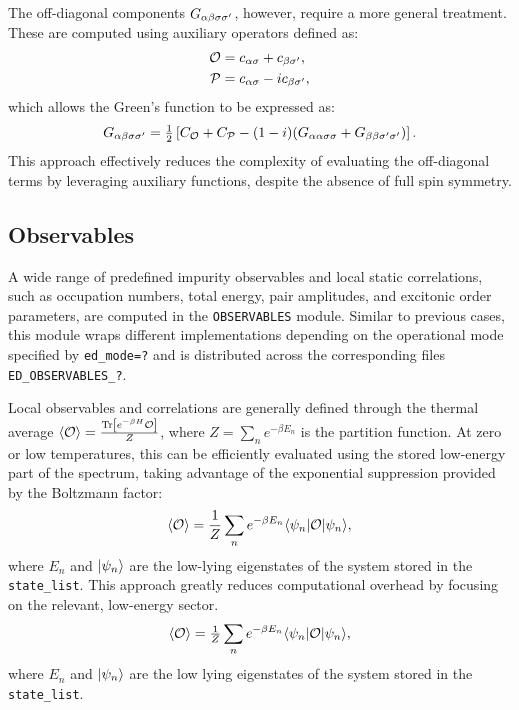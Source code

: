 \documentclass[edipack2.tex]{subfiles}
\begin{document}
The off-diagonal components $G_{\alpha\beta\sigma\sigma'}$, however, 
require a more general treatment. These are computed using 
auxiliary operators defined as:
\begin{align*}
{\cal O} &= c_{\alpha\sigma} + c_{\beta\sigma'}, \\
{\cal P} &= c_{\alpha\sigma} - i c_{\beta\sigma'},
\end{align*}
which allows the Green's function to be expressed as:
\begin{equation}
G_{\alpha\beta\sigma\sigma'} = \tfrac{1}{2} \left[ C_{\cal O} + C_{\cal P} - 
(1-i)(G_{\alpha\alpha\sigma\sigma} + G_{\beta\beta\sigma'\sigma'}) \right].
\end{equation}
This approach effectively reduces the complexity of 
evaluating the off-diagonal terms by leveraging auxiliary 
functions, despite the absence of full spin symmetry.





\subsection{Observables}\label{sSecObc}
A wide range of predefined impurity observables and local 
static correlations, such as occupation numbers, total 
energy, pair amplitudes, and excitonic order parameters, 
are computed in the \texttt{OBSERVABLES} module. Similar to 
previous cases, this module wraps different implementations 
depending on the operational mode specified by 
{\tt ed\_mode=?} and is distributed across the corresponding 
files {\tt ED\_OBSERVABLES\_?}. 



Local observables and correlations are generally defined 
through the thermal average 
$\langle {\cal O}\rangle = \frac{{\rm Tr}\left[e^{-\beta H}{\cal O}\right]}{Z}$, 
where $Z = \sum_n e^{-\beta E_n}$ is the partition function. 
At zero or low temperatures, this can be efficiently 
evaluated using the stored low-energy part of the spectrum, 
taking advantage of the exponential suppression provided by 
the Boltzmann factor:
\begin{equation}
\langle {\cal O}\rangle = \frac{1}{Z}\sum_n e^{-\beta E_n}
\langle \psi_n| {\cal O} |\psi_n\rangle,
\label{eq:thermal_average}
\end{equation}
where $E_n$ and $|\psi_n\rangle$ are the low-lying eigenstates 
of the system stored in the {\tt state\_list}. This approach 
greatly reduces computational overhead by focusing on the 
relevant, low-energy sector.
\begin{equation}
  \langle {\cal O}\rangle  = \tfrac{1}{Z}\sum_n e^{-\beta  E_n}
  \langle \psi_n|{\cal O}|\psi_n\rangle,
  \label{eq:thermal_average}
\end{equation}
where $E_n$ and $|\psi_n\rangle$ are the low lying eigenstates of the
system stored in the {\tt state\_list}. 
\end{document}
